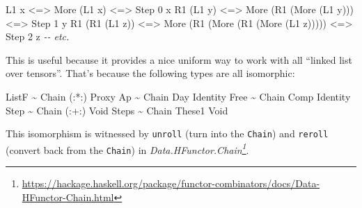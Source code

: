 \documentclass[]{article}
\newenvironment{Shaded}{}{}
\newcommand{\CommentTok}[1]{\textcolor[rgb]{0.38,0.63,0.69}{\textit{#1}}}
\newcommand{\DataTypeTok}[1]{\textcolor[rgb]{0.56,0.13,0.00}{#1}}
\newcommand{\DecValTok}[1]{\textcolor[rgb]{0.25,0.63,0.44}{#1}}
\newcommand{\NormalTok}[1]{#1}
\newcommand{\OperatorTok}[1]{\textcolor[rgb]{0.40,0.40,0.40}{#1}}
\renewcommand{\href}[2]{#2\footnote{\url{#1}}}
\begin{document}
\begin{itemize}
\begin{Shaded}
\begin{Highlighting}[]
\DataTypeTok{L1}\NormalTok{ x           }\OperatorTok{\textless{}=\textgreater{}} \DataTypeTok{More}\NormalTok{ (}\DataTypeTok{L1}\NormalTok{ x)                         }\OperatorTok{\textless{}=\textgreater{}} \DataTypeTok{Step} \DecValTok{0}\NormalTok{ x}
\DataTypeTok{R1}\NormalTok{ (}\DataTypeTok{L1}\NormalTok{ y)      }\OperatorTok{\textless{}=\textgreater{}} \DataTypeTok{More}\NormalTok{ (}\DataTypeTok{R1}\NormalTok{ (}\DataTypeTok{More}\NormalTok{ (}\DataTypeTok{L1}\NormalTok{ y)))             }\OperatorTok{\textless{}=\textgreater{}} \DataTypeTok{Step} \DecValTok{1}\NormalTok{ y}
\DataTypeTok{R1}\NormalTok{ (}\DataTypeTok{R1}\NormalTok{ (}\DataTypeTok{L1}\NormalTok{ z)) }\OperatorTok{\textless{}=\textgreater{}} \DataTypeTok{More}\NormalTok{ (}\DataTypeTok{R1}\NormalTok{ (}\DataTypeTok{More}\NormalTok{ (}\DataTypeTok{R1}\NormalTok{ (}\DataTypeTok{More}\NormalTok{ (}\DataTypeTok{L1}\NormalTok{ z))))) }\OperatorTok{\textless{}=\textgreater{}} \DataTypeTok{Step} \DecValTok{2}\NormalTok{ z}
\CommentTok{{-}{-} etc.}
\end{Highlighting}
\end{Shaded}

  This is useful because it provides a nice uniform way to work with all
  ``linked list over tensors''. That's because the following types are all
  isomorphic:

\begin{Shaded}
\begin{Highlighting}[]
\DataTypeTok{ListF} \OperatorTok{\textasciitilde{}} \DataTypeTok{Chain}\NormalTok{ (}\OperatorTok{:*:}\NormalTok{)  }\DataTypeTok{Proxy}
\DataTypeTok{Ap}    \OperatorTok{\textasciitilde{}} \DataTypeTok{Chain} \DataTypeTok{Day}    \DataTypeTok{Identity}
\DataTypeTok{Free}  \OperatorTok{\textasciitilde{}} \DataTypeTok{Chain} \DataTypeTok{Comp}   \DataTypeTok{Identity}
\DataTypeTok{Step}  \OperatorTok{\textasciitilde{}} \DataTypeTok{Chain}\NormalTok{ (}\OperatorTok{:+:}\NormalTok{)  }\DataTypeTok{Void}
\DataTypeTok{Steps} \OperatorTok{\textasciitilde{}} \DataTypeTok{Chain} \DataTypeTok{These1} \DataTypeTok{Void}
\end{Highlighting}
\end{Shaded}

  This isomorphism is witnessed by \texttt{unroll} (turn into the
  \texttt{Chain}) and \texttt{reroll} (convert back from the \texttt{Chain}) in
  \emph{\href{https://hackage.haskell.org/package/functor-combinators/docs/Data-HFunctor-Chain.html}{Data.HFunctor.Chain}}.


\end{itemize}
\end{document}
